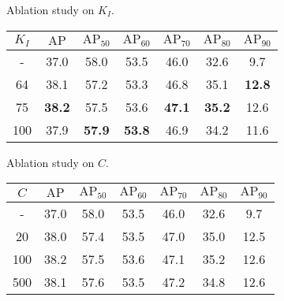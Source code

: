 \documentclass[runningheads]{llncs}
\begin{document}
\noindent
\begin{minipage}[!t]{\textwidth}
    \begin{minipage}{0.49\textwidth}
    \centering
    \makeatletter{}\makeatother\caption{Ablation study on $K_I$.}
        \setlength{\tabcolsep}{1pt}
        \begin{tabular}{ccccccc}
        \toprule
        $K_I$ & $\mathrm{AP}$ & $\mathrm{AP}_{50}$ & $\mathrm{AP}_{60}$ & $\mathrm{AP}_{70}$ & $\mathrm{AP}_{80}$ & $\mathrm{AP}_{90}$\\
        \midrule
        - & 37.0 & 58.0 & 53.5 & 46.0 & 32.6 & 9.7\\
        \midrule
        64 & 38.1 & 57.2 & 53.3 & 46.8 & 35.1 & \textbf{12.8}\\
        75 & \textbf{38.2} & 57.5 & 53.6 & \textbf{47.1} & \textbf{35.2} & 12.6\\
        100 & 37.9 & \textbf{57.9} & \textbf{53.8} & 46.9 & 34.2 & 11.6\\
        \bottomrule
        \end{tabular}
        \label{tab:dynamic_label_assignment}
    \end{minipage}
    \begin{minipage}{0.5\textwidth}
    \centering
        \makeatletter{}\makeatother\caption{Ablation study on $C$.}
        \setlength{\tabcolsep}{1pt}
        \begin{tabular}{ccccccc}
        \toprule
        $C$ & $\mathrm{AP}$ & $\mathrm{AP}_{50}$ & $\mathrm{AP}_{60}$ & $\mathrm{AP}_{70}$ & $\mathrm{AP}_{80}$ & $\mathrm{AP}_{90}$\\
        \midrule
        - & 37.0 & 58.0 & 53.5 & 46.0 & 32.6 & 9.7\\
        \midrule
        20 & 38.0 & 57.4 & 53.5 & 47.0 & 35.0 & 12.5\\
        100 & 38.2 & 57.5 & 53.6 & 47.1 & 35.2 & 12.6\\
        500 & 38.1 & 57.6 & 53.5 & 47.2 & 34.8 & 12.6\\
        \bottomrule
        \end{tabular}
        \label{tab:iteration_count}
    \end{minipage}
\end{minipage}
\end{document}

